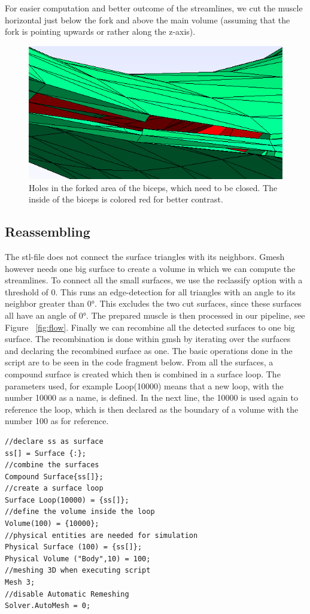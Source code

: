 \documentclass[preprint,journal]{vgtc}       %
\begin{document}
For easier computation and better outcome of the streamlines, we cut the muscle horizontal just below the fork and above the main volume (assuming that the fork is pointing upwards or rather along the z-axis). 

\begin{figure}
	\begin{center}
		\includegraphics[width = .6\linewidth]{holes.png}
	\end{center}
	\caption{Holes in the forked area of the biceps, which need to be closed. The inside of the biceps is colored red for better contrast.}
	\label{fig:holes}
\end{figure}

\subsection{Reassembling}
The stl-file does not connect the surface triangles with its neighbors. 
Gmesh however needs one big surface to create a volume in which we can compute the streamlines. 
To connect all the small surfaces, we use the reclassify option with a threshold of 0.
This runs an edge-detection for all triangles with an angle to its neighbor greater than \ang{0}. 
This excludes the two cut surfaces, since these surfaces all have an angle of \ang{0}. 
The prepared muscle is then processed in our pipeline, see Figure ~\ref{fig:flow}. 
Finally we can recombine all the detected surfaces to one big surface. 
The recombination is done within gmsh by iterating over the surfaces and declaring the recombined surface as one. 
The basic operations done in the script are to be seen in the code fragment below. 
From all the surfaces, a compound surface is created which then is combined in a surface loop. 
The parameters used, for example Loop(10000) means that a new loop, with the number 10000 as a name, is defined. 
In the next line, the 10000 is used again to reference the loop, which is then declared as the boundary of a volume with the number 100 as for reference. 

\begin{verbatim}
//declare ss as surface
ss[] = Surface {:};
//combine the surfaces
Compound Surface{ss[]};
//create a surface loop
Surface Loop(10000) = {ss[]};
//define the volume inside the loop
Volume(100) = {10000};
//physical entities are needed for simulation
Physical Surface (100) = {ss[]};
Physical Volume ("Body",10) = 100;
//meshing 3D when executing script
Mesh 3;
//disable Automatic Remeshing
Solver.AutoMesh = 0;
\end{verbatim}
\end{document}
